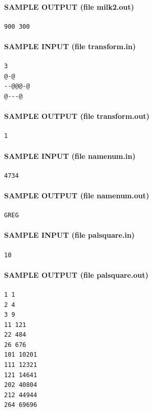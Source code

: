 \documentclass[11pt]{article}
\begin{document}
\paragraph{SAMPLE OUTPUT (file milk2.out)}
\begin{verbatim}
900 300
\end{verbatim}

\paragraph{SAMPLE INPUT (file transform.in)}
\begin{verbatim}
3
@-@
--@@@-@
@---@
\end{verbatim}

\paragraph{SAMPLE OUTPUT (file transform.out)}
\begin{verbatim}
1
\end{verbatim}

\paragraph{SAMPLE INPUT (file namenum.in)}
\begin{verbatim}
4734
\end{verbatim}

\paragraph{SAMPLE OUTPUT (file namenum.out)}
\begin{verbatim}
GREG
\end{verbatim}

\paragraph{SAMPLE INPUT (file palsquare.in)}
\begin{verbatim}
10
\end{verbatim}

\paragraph{SAMPLE OUTPUT (file palsquare.out)}
\begin{verbatim}
1 1
2 4
3 9
11 121
22 484
26 676
101 10201
111 12321
121 14641
202 40804
212 44944
264 69696
\end{verbatim}
\end{document}
